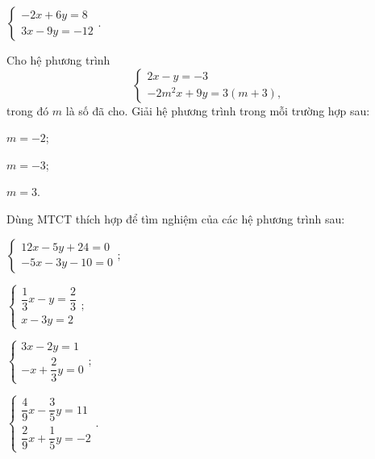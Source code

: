 \begin{exercises}
\begin{questions}[resume=SGK]
\begin{questions}
            \item $\begin{cases}-2x+6y=8\\3x-9y=-12\end{cases}.$

            \answerline
            \answerline
            \answerline
        \end{questions}

        \item Cho hệ phương trình
        \[
            \begin{cases}
                2x-y=-3\\
                -2m^2x+9y=3(m+3),
            \end{cases}
        \]
        trong đó $m$ là số đã cho. Giải hệ phương trình trong mỗi trường hợp sau:
        \begin{questions}
            \item $m=-2$;

            \answerline
            \answerline

            \item $m=-3$;

            \answerline
            \answerline

            \item $m=3$.

            \answerline
            \answerline
        \end{questions}

        \item Dùng MTCT thích hợp để tìm nghiệm của các hệ phương trình sau:
        \begin{questions}
            \item $\begin{cases}12x-5y+24=0\\-5x-3y-10=0\end{cases};$

            \answerline

            \item $\begin{cases}\dfrac{1}{3}x-y=\dfrac{2}{3}\\x-3y=2\end{cases};$

            \answerline

            \item $\begin{cases}3x-2y=1\\-x+\dfrac{2}{3}y=0\end{cases};$

            \answerline

            \item $\begin{cases}\dfrac{4}{9}x-\dfrac{3}{5}y=11\\\dfrac{2}{9}x+\dfrac{1}{5}y=-2\end{cases}.$

            \answerline
        \end{questions}
    \end{questions}
\end{exercises}

